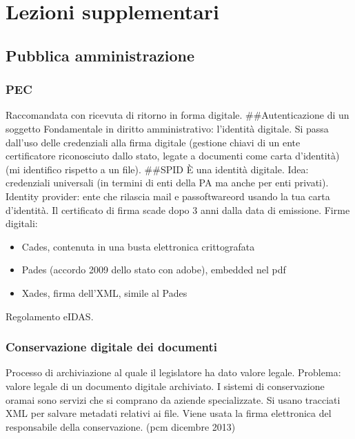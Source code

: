 

\chapter{Lezioni supplementari}

\section{Pubblica amministrazione}

\subsection{PEC}

Raccomandata con ricevuta di ritorno in forma digitale.
\#\#Autenticazione di un soggetto Fondamentale in diritto
amministrativo: l'identità digitale. Si passa dall'uso delle credenziali
alla firma digitale (gestione chiavi di un ente certificatore
riconosciuto dallo stato, legate a documenti come carta d'identità) (mi
identifico rispetto a un file). \#\#SPID È una identità digitale. Idea:
credenziali universali (in termini di enti della PA ma anche per enti
privati). Identity provider: ente che rilascia mail e passoftwareord usando la
tua carta d'identità. Il certificato di firma scade dopo 3 anni dalla
data di emissione. Firme digitali:

\begin{itemize}
\item
  Cades, contenuta in una busta elettronica crittografata
\item
  Pades (accordo 2009 dello stato con adobe), embedded nel pdf
\item
  Xades, firma dell'XML, simile al Pades
\end{itemize}

Regolamento eIDAS.

\subsection{Conservazione digitale dei
documenti}

Processo di archiviazione al quale il legislatore ha dato valore legale.
Problema: valore legale di un documento digitale archiviato. I sistemi
di conservazione oramai sono servizi che si comprano da aziende
specializzate. Si usano tracciati XML per salvare metadati relativi ai
file. Viene usata la firma elettronica del responsabile della
conservazione. (pcm dicembre 2013)

